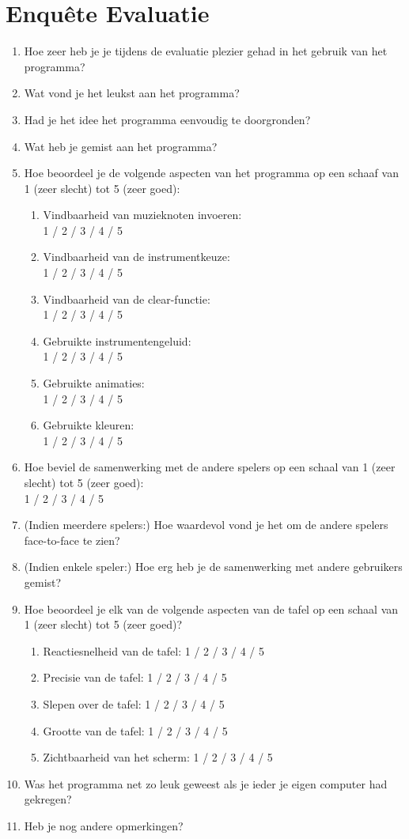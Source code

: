 \documentclass{acm}
\begin{document}
\section{Enqu\^ete Evaluatie}
\label{sec_bijlage}
\begin{enumerate}
 \item Hoe zeer heb je je tijdens de evaluatie plezier gehad in het gebruik van het programma?
 \item Wat vond je het leukst aan het programma?
 \item Had je het idee het programma eenvoudig te doorgronden?
 \item Wat heb je gemist aan het programma?
 \item Hoe beoordeel je de volgende aspecten van het programma op een schaaf van 1 (zeer slecht) tot 5 (zeer goed):
 \begin{enumerate}
   \item Vindbaarheid van muzieknoten invoeren: \\ 1 / 2 / 3 / 4 / 5
   \item Vindbaarheid van de instrumentkeuze: \\ 1 / 2 / 3 / 4 / 5
   \item Vindbaarheid van de clear-functie: \\ 1 / 2 / 3 / 4 / 5
   \item Gebruikte instrumentengeluid: \\ 1 / 2 / 3 / 4 / 5
   \item Gebruikte animaties: \\ 1 / 2 / 3 / 4 / 5
   \item Gebruikte kleuren: \\ 1 / 2 / 3 / 4 / 5
\end{enumerate}
 \item Hoe beviel de samenwerking met de andere spelers op een schaal van 1 (zeer slecht) tot 5 (zeer goed):  \\ 1 / 2 / 3 / 4 / 5
 \item (Indien meerdere spelers:) Hoe waardevol vond je het om de andere spelers face-to-face te zien?

 \item (Indien enkele speler:) Hoe erg heb je de samenwerking met andere gebruikers gemist?

 \item Hoe beoordeel je elk van de volgende aspecten van de tafel op een schaal van 1 (zeer slecht) tot 5 (zeer goed)? 

  \begin{enumerate}
   \item Reactiesnelheid van de tafel: \tabto{4.5cm}1 / 2 / 3 / 4 / 5
   \item Precisie van de tafel:        \tabto{4.5cm}1 / 2 / 3 / 4 / 5
   \item Slepen over de tafel:         \tabto{4.5cm}1 / 2 / 3 / 4 / 5
   \item Grootte van de tafel:         \tabto{4.5cm}1 / 2 / 3 / 4 / 5
   \item Zichtbaarheid van het scherm: \tabto{4.5cm}1 / 2 / 3 / 4 / 5
  \end{enumerate}

  \item Was het programma net zo leuk geweest als je ieder je eigen computer had gekregen?

  \item Heb je nog andere opmerkingen?
\end{enumerate}
\end{document}
